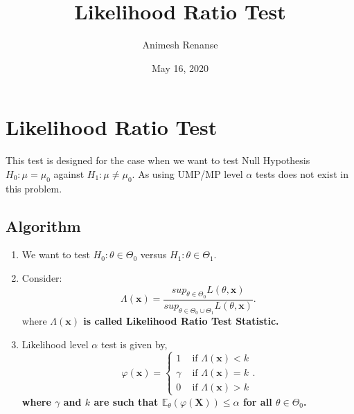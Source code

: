 \documentclass[a4paper]{article}
\title{Likelihood Ratio Test}
\author{Animesh Renanse}
\date{May 16, 2020}
\begin{document}
\maketitle
\newpage

\section{Likelihood Ratio Test}
This test is designed for the case when we want to test Null Hypothesis $H_0:\mu = \mu_0$ against $H_1:\mu \neq  \mu_0$. As using UMP/MP level $\alpha$ tests does not exist in this problem.
\subsection{Algorithm}
\begin{enumerate}
	\item {We want to test $H_0:\theta \in \Theta_0$ versus $H_1:\theta \in \Theta_1$.}
	\item{Consider:
			\[
			\Lambda\left( \mathbf{x} \right) = \frac{sup_{\theta \in \Theta_0} L\left( \theta,\mathbf{x} \right) }{sup_{\theta \in \Theta_0\cup\Theta_1}L\left( \theta,\mathbf{x} \right) }
			.\]
			where \textbf{$\Lambda\left( \mathbf{x} \right) $ is called Likelihood Ratio Test Statistic.}
		}
	\item{Likelihood level $\alpha$ test is given by,
		\[
			\varphi\left( \mathbf{x} \right)  = \begin{cases}
				1 & \text{ if } \Lambda\left( \mathbf{x} \right) < k\\
				\gamma & \text{ if } \Lambda\left( \mathbf{x} \right) = k\\
				0 & \text{ if } \Lambda\left( \mathbf{x} \right) > k
			\end{cases}
		.\] 
		\textbf{where $\gamma$ and $k$ are such that $\mathbb{E}_{\theta}\left( \varphi\left( \mathbf{X} \right)  \right) \le  \alpha$ for all $\theta \in \Theta_0$.} 
		}
\end{enumerate}
\end{document}
